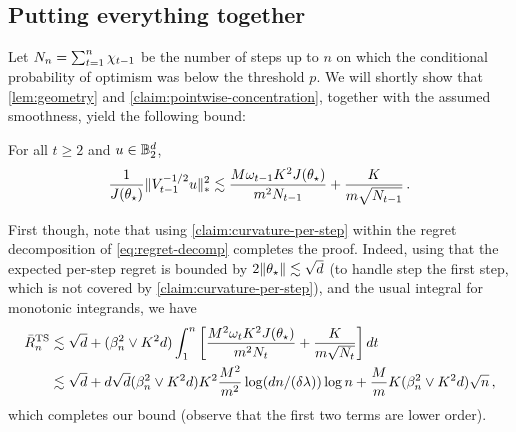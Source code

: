 \subsection{Putting everything together}

Let $N_n = \sum_{t=1}^n \chi_{t-1}$ be the number of steps up to $n$ on which the conditional probability of optimism was below the threshold $p$. We will shortly show that \cref{lem:geometry} and \cref{claim:pointwise-concentration}, together with the assumed smoothness, yield the following bound:

\begin{claim}\label{claim:curvature-per-step}
  For all $t \geq 2$ and $u \in \mathbb{B}^d_2$,
  $$
      \frac{1}{J(\theta_\star)} \|V_{t-1}^{-1/2} u\|_{*}^2 \lesssim \frac{ M\omega_{t-1} K^2 J(\theta_\star)}{m^2 N_{t-1}} + \frac{K}{m\sqrt{N_{t-1}}}\,.
  $$
\end{claim}

\noindent First though, note that using \cref{claim:curvature-per-step} within the regret decomposition of \cref{eq:regret-decomp} completes the proof. Indeed, using that the expected per-step regret is bounded by $2\|\theta_\star\|\lesssim \sqrt{d}$ (to handle step the first step, which is not covered by \cref{claim:curvature-per-step}), and the usual integral for monotonic integrands, we have
\begin{align*}
  \bar{R}^{\text{TS}}_n
  &\lesssim \sqrt{d} + (\beta_n^2 \vee K^2 d) \int_1^{n}  \left[\frac{ M^2\omega_t K^2 J(\theta_\star)}{m^2 N_t} + \frac{K}{m\sqrt{N_t}}\right] dt \\
  &\lesssim \sqrt{d} + d\sqrt{d} (\beta_n^2 \vee K^2 d) K^2 \frac{M^2}{m^2}\log(d n /(\delta\lambda))\log n + \frac{M}{m} K (\beta_n^2 \vee K^2 d) \sqrt{n}\,,
\end{align*}
which completes our bound (observe that the first two terms are lower order).  


